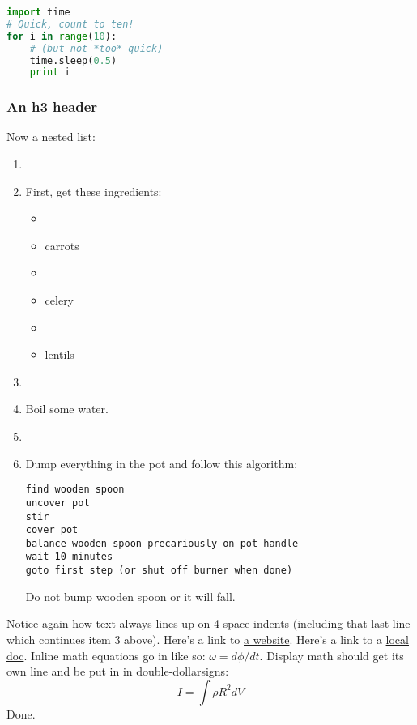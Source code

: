 \begin{lstlisting}[language=python]
import time
# Quick, count to ten!
for i in range(10):
    # (but not *too* quick)
    time.sleep(0.5)
    print i
\end{lstlisting}
\subsubsection{An h3 header}
Now a nested list:

\begin{enumerate}
\item \item First, get these ingredients:
\linebreak[1]

\begin{itemize}
\item \item carrots

\item \item celery

\item \item lentils

\end{itemize}



\item \item Boil some water.


\item \item Dump everything in the pot and follow
this algorithm:
\linebreak[1]

\begin{verbatim}
find wooden spoon
uncover pot
stir
cover pot
balance wooden spoon precariously on pot handle
wait 10 minutes
goto first step (or shut off burner when done)
\end{verbatim}
Do not bump wooden spoon or it will fall.


\end{enumerate}

Notice again how text always lines up on 4-space indents (including
that last line which continues item 3 above). Here's a link to \href{http://foo.bar}{a
website}. Here's a link to a \href{local-doc.html}{local doc}. 
Inline math equations go in like so: $\omega = d\phi / dt$. Display
math should get its own line and be put in in double-dollarsigns:
$$I = \int \rho R^{2} dV$$
Done.
